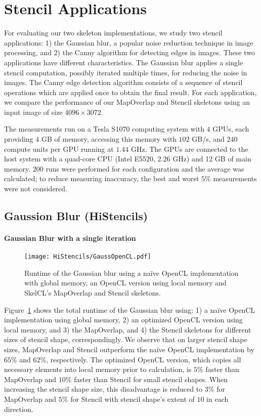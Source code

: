 \section{Stencil Applications}

For evaluating our two skeleton implementations, we study two stencil applications:
1) the Gaussian blur, a popular noise reduction technique in image processing, and
2) the Canny algorithm for detecting edges in images.
These two applications have different characteristics.
The Gaussian blur applies a single stencil computation, possibly iterated multiple times, for reducing the noise in images.
The Canny edge detection algorithm consists of a sequence of stencil operations which are applied once to obtain the final result.
For each application, we compare the performance of our MapOverlap and Stencil skeletons using an input image of size $4096 \times 3072$.

The measurements run on a Tesla S1070 computing system with $4$ GPUs, each providing $4$ GB of memory, accessing this memory with $102$ GB/s, and $240$ compute units per GPU running at $1.44$ GHz.
The GPUs are connected to the host system with a quad-core CPU (Intel E5520, $2.26$ GHz) and 12 GB of main memory.
$200$ runs were performed for each configuration and the average was calculated; to reduce measuring inaccuracy, the best and worst $5\%$ measurements were not considered. 

\subsection{Gaussion Blur (HiStencils)}

\paragraph{Gaussian Blur with a single iteration}

\begin{figure}[tbp]
	\centering
	\texttt{[image: HiStencils/GaussOpenCL.pdf]}
	\caption{Runtime of the Gaussian blur using a na{\"i}ve OpenCL implementation with global memory, an OpenCL version using local memory and SkelCL's MapOverlap and Stencil skeletons.}
	\label{fig:gaussAbs}
\end{figure} 

Figure~\ref{fig:gaussAbs} shows the total runtime of the Gaussian blur using:
1) a na{\"i}ve OpenCL implementation using global memory,
2) an optimized OpenCL version using local memory, and
3) the MapOverlap, and
4) the Stencil skeletons for different sizes of stencil shape, correspondingly.
We observe that on larger stencil shape sizes, MapOverlap and Stencil outperform the na{\"i}ve OpenCL implementation by $65\%$ and $62\%$, respectively.
The optimized OpenCL version, which copies all necessary elements into local memory prior to calculation, is $5\%$ faster than MapOverlap and $10\%$ faster than Stencil for small stencil shapes.
When increasing the stencil shape size, this disadvantage is reduced to $3\%$ for MapOverlap and $5\%$ for Stencil with stencil shape's extent of $10$ in each direction.

